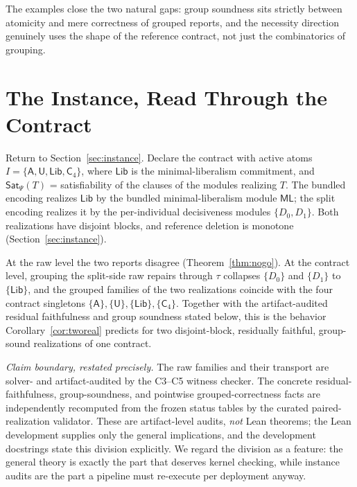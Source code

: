 \documentclass[sigplan,10pt,review,anonymous,nonacm]{acmart}
\theoremstyle{acmdefinition}
\newcommand{\SatPsi}{{\mathsf{Sat}_\Psi}}
\newcommand{\ML}{\mathsf{ML}}
\newcommand{\modsym}[1]{\mathsf{#1}}
\begin{document}
The examples close the two natural gaps: group soundness sits strictly
between atomicity and mere correctness of grouped reports, and the necessity
direction genuinely uses the shape of the reference contract, not just the
combinatorics of grouping.

\section{The Instance, Read Through the Contract}
\label{sec:back}

Return to Section~\ref{sec:instance}. Declare the contract with active atoms
$I = \{\modsym{A}, \modsym{U}, \mathsf{Lib}, \mathsf{C}_4\}$, where
$\mathsf{Lib}$ is the minimal-liberalism commitment, and $\SatPsi(T)$ =
satisfiability of the clauses of the modules realizing $T$. The bundled
encoding realizes $\mathsf{Lib}$ by the bundled minimal-liberalism module
$\ML$; the split encoding realizes it by the per-individual decisiveness
modules $\{D_0, D_1\}$. Both realizations have disjoint blocks, and reference
deletion is monotone (Section~\ref{sec:instance}).

At the raw level the two reports disagree (Theorem~\ref{thm:nogo}). At the
contract level, grouping the split-side raw repairs through $\tau$ collapses
$\{D_0\}$ and $\{D_1\}$ to $\{\mathsf{Lib}\}$, and the grouped families of
the two realizations coincide with the four contract singletons
$\{\modsym{A}\}, \{\modsym{U}\}, \{\mathsf{Lib}\}, \{\mathsf{C}_4\}$.
Together with the artifact-audited residual faithfulness and group soundness
stated below, this is the behavior Corollary~\ref{cor:tworeal} predicts for two
disjoint-block, residually faithful, group-sound realizations of one contract.

\emph{Claim boundary, restated precisely.}
The raw families and their transport are solver- and artifact-audited by the
C3--C5 witness checker. The concrete residual-faithfulness, group-soundness,
and pointwise grouped-correctness facts are independently recomputed from the
frozen status tables by the curated paired-realization validator. These are
artifact-level audits, \emph{not} Lean theorems; the Lean development supplies
only the general implications, and the development docstrings state this
division explicitly. We regard the
division as a feature: the general theory is exactly the part that deserves
kernel checking, while instance audits are the part a pipeline must
re-execute per deployment anyway.
\end{document}
